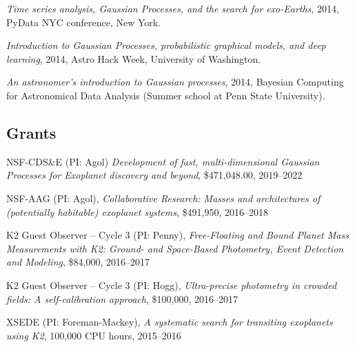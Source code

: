 \documentclass[12pt,letterpaper]{article}
\begin{document}
\begin{list}{}{\cvlist}
  \item \emph{Time series analysis, Gaussian Processes, and the search for
          exo-Earths},
        2014, PyData NYC conference, New York.

  \item \emph{Introduction to Gaussian Processes, probabilistic graphical
          models, and deep learning},
        2014, Astro Hack Week, University of Washington.

  \item \emph{An astronomer's introduction to Gaussian processes},
        2014, Bayesian Computing for Astronomical Data Analysis (Summer school at
        Penn State University).

\end{list}

\subsection{Grants}
\begin{list}{}{\cvlist}
  \item NSF-CDS\&E (PI: Agol)
        \emph{Development of fast, multi-dimensional Gaussian Processes for Exoplanet discovery and beyond},
        \$471,048.00, 2019--2022

  \item
        NSF-AAG (PI: Agol),
        \emph{Collaborative Research: Masses and architectures of (potentially
          habitable) exoplanet systems},
        \$491,950, 2016--2018

  \item
        K2 Guest Observer -- Cycle 3 (PI: Penny),
        \emph{Free-Floating and Bound Planet Mass Measurements with K2: Ground- and
          Space-Based Photometry, Event Detection and Modeling},
        \$84,000, 2016--2017

  \item
        K2 Guest Observer -- Cycle 3 (PI: Hogg),
        \emph{Ultra-precise photometry in crowded fields: A self-calibration
          approach},
        \$100,000, 2016--2017

  \item
        XSEDE (PI: Foreman-Mackey),
        \emph{A systematic search for transiting exoplanets using K2},
        100,000 CPU hours, 2015--2016
\end{list}
\end{document}
